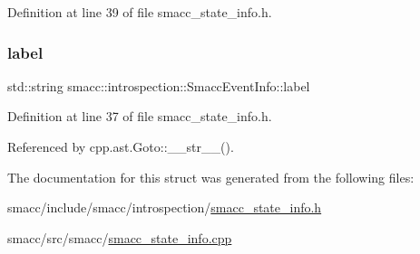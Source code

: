 Definition at line 39 of file smacc\+\_\+state\+\_\+info.\+h.

\mbox{\label{structsmacc_1_1introspection_1_1SmaccEventInfo_a2bbed6ad8013758e23761c92d70c2fd1}} 
\subsubsection{\texorpdfstring{label}{label}}
{\footnotesize\ttfamily std\+::string smacc\+::introspection\+::\+Smacc\+Event\+Info\+::label}



Definition at line 37 of file smacc\+\_\+state\+\_\+info.\+h.



Referenced by cpp.\+ast.\+Goto\+::\+\_\+\+\_\+str\+\_\+\+\_\+().



The documentation for this struct was generated from the following files\+:\begin{DoxyCompactItemize}
\item 
smacc/include/smacc/introspection/\hyperlink{smacc__state__info_8h}{smacc\+\_\+state\+\_\+info.\+h}\item 
smacc/src/smacc/\hyperlink{smacc__state__info_8cpp}{smacc\+\_\+state\+\_\+info.\+cpp}\end{DoxyCompactItemize}
